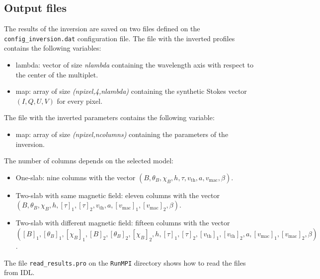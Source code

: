\documentclass[12pt]{article}
\begin{document}
\subsection{Output files}
The results of the inversion are saved on two files defined on the \texttt{config\_inversion.dat} configuration
file. The file with the inverted profiles contains the following variables:
\begin{itemize}
\item lambda: vector of size \textit{nlambda} containing the wavelength axis with respect to the center of the multiplet.
\item map: array of size \textit{(npixel,4,nlambda)} containing the synthetic Stokes vector $(I,Q,U,V)$ for every pixel.
\end{itemize}
The file with the inverted parameters contains the following variable:
\begin{itemize}
\item map: array of size \textit{(npixel,ncolumns)} containing the parameters of the inversion. 
\end{itemize}
The number of columns depends on the selected model:
\begin{itemize}
\item One-slab: nine columns with the vector $(B,\theta_B,\chi_B,h,\tau,v_\mathrm{th},a,v_\mathrm{mac},\beta)$.
\item Two-slab with same magnetic field: eleven columns with the vector \\ $(B,\theta_B,\chi_B,h,[\tau]_1,[\tau]_2,v_\mathrm{th},a,[v_\mathrm{mac}]_1,
[v_\mathrm{mac}]_2,\beta)$.
\item Two-slab with different magnetic field: fifteen columns with the vector \\ $([B]_1,[\theta_B]_1,[\chi_B]_1,[B]_2,[\theta_B]_2,[\chi_B]_2,
h,[\tau]_1,[\tau]_2,[v_\mathrm{th}]_1,[v_\mathrm{th}]_2,a,[v_\mathrm{mac}]_1,[v_\mathrm{mac}]_2,\beta)$.
\end{itemize}
The file \texttt{read\_results.pro} on the \texttt{RunMPI} directory shows how to read the
files from IDL.
\end{document}
